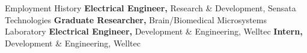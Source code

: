
\begin{rubric}{\faBriefcase[solid] Employment History}
\entry*[2024 -- now][]%
	\textbf{Electrical Engineer,} Research \& Development, Sensata Technologies
%
%
\entry*[2021 -- 2023][]%
	\textbf{Graduate Researcher,} Brain/Biomedical Microsystems Laboratory
%
\entry*[2015 -- 2017][]%
	\textbf{Electrical Engineer,} Development \& Engineering, Welltec
%
\entry*[2014 -- 2015][]%
	\textbf{Intern,} Development \& Engineering, Welltec
%
\end{rubric}